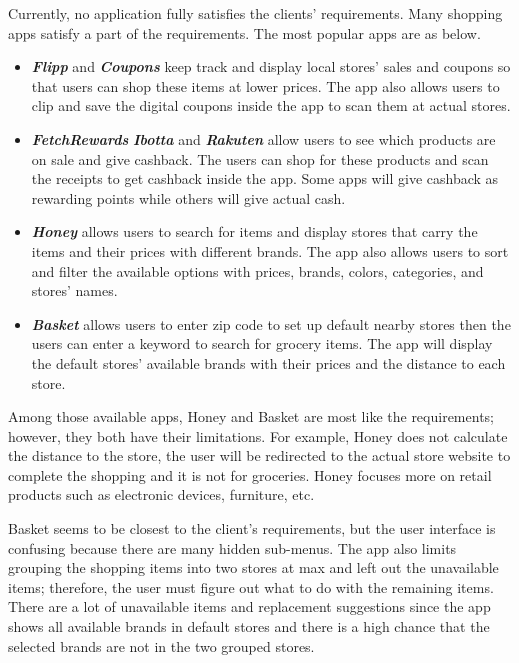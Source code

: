 Currently, no application fully satisfies the clients' requirements. Many shopping apps satisfy a part of the requirements. The most popular apps are as below.
\begin{itemize}
    \item \textbf{\emph{Flipp}} \cite{Flipp} and \textbf{\emph{Coupons}}\cite{Coupons} keep track and display local stores' sales and coupons so that users can shop these items at lower prices. The app also allows users to clip and save the digital coupons inside the app to scan them at actual stores. 

    \item \textbf{\emph{FetchRewards}}\cite{Fetch} \textbf{\emph{Ibotta}}\cite{Ibotta} and \textbf{\emph{Rakuten}}\cite{Rakuten} allow users to see which products are on sale and give cashback. The users can shop for these products and scan the receipts to get cashback inside the app. Some apps will give cashback as rewarding points while others will give actual cash. 

    \item \textbf{\emph{Honey}}\cite{Honey} allows users to search for items and display stores that carry the items and their prices with different brands. The app also allows users to sort and filter the available options with prices, brands, colors, categories, and stores' names. 

    \item \textbf{\emph{Basket}}\cite{Basket} allows users to enter zip code to set up default nearby stores then the users can enter a keyword to search for grocery items. The app will display the default stores' available brands with their prices and the distance to each store.
\end{itemize}
Among those available apps, Honey and Basket are most like the requirements; however, they both have their limitations. For example, Honey does not calculate the distance to the store, the user will be redirected to the actual store website to complete the shopping and it is not for groceries. Honey focuses more on retail products such as electronic devices, furniture, etc.

Basket seems to be closest to the client's requirements, but the user interface is confusing because there are many hidden sub-menus.  The app also limits grouping the shopping items into two stores at max and left out the unavailable items; therefore, the user must figure out what to do with the remaining items. There are a lot of unavailable items and replacement suggestions since the app shows all available brands in default stores and there is a high chance that the selected brands are not in the two grouped stores.

